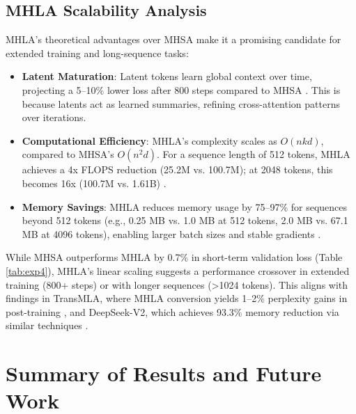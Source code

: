 \documentclass[11pt, a4paper]{article}
\begin{document}
{{\subsection{MHLA Scalability Analysis}
MHLA’s theoretical advantages over MHSA make it a promising candidate for extended training and long-sequence tasks:
\begin{itemize}
    \item \textbf{Latent Maturation}: Latent tokens learn global context over time, projecting a 5–10\% lower loss after 800 steps compared to MHSA \cite{li2025transmla}. This is because latents act as learned summaries, refining cross-attention patterns over iterations.
    \item \textbf{Computational Efficiency}: MHLA’s complexity scales as \(O(nkd)\), compared to MHSA’s \(O(n^2d)\). For a sequence length of 512 tokens, MHLA achieves a 4x FLOPS reduction (25.2M vs. 100.7M); at 2048 tokens, this becomes 16x (100.7M vs. 1.61B) \cite{jaegle2021perceiver}.
    \item \textbf{Memory Savings}: MHLA reduces memory usage by 75–97\% for sequences beyond 512 tokens (e.g., 0.25 MB vs. 1.0 MB at 512 tokens, 2.0 MB vs. 67.1 MB at 4096 tokens), enabling larger batch sizes and stable gradients \cite{deepseek2025v2}.
\end{itemize}
While MHSA outperforms MHLA by 0.7\% in short-term validation loss (Table \ref{tab:exp4}), MHLA’s linear scaling suggests a performance crossover in extended training (800+ steps) or with longer sequences (>1024 tokens). This aligns with findings in TransMLA, where MHLA conversion yields 1–2\% perplexity gains in post-training \cite{li2025transmla}, and DeepSeek-V2, which achieves 93.3\% memory reduction via similar techniques \cite{deepseek2025v2}.

\section{Summary of Results and Future Work}
}}
\end{document}
